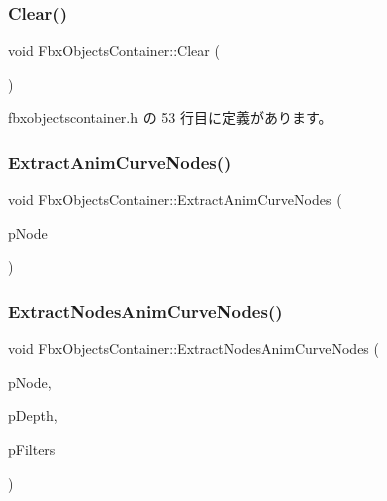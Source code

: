 \subsubsection{\texorpdfstring{Clear()}{Clear()}}
{\footnotesize\ttfamily void Fbx\+Objects\+Container\+::\+Clear (\begin{DoxyParamCaption}{ }\end{DoxyParamCaption})\hspace{0.3cm}{\ttfamily [inline]}}



 fbxobjectscontainer.\+h の 53 行目に定義があります。

\mbox{\label{class_fbx_objects_container_a649c2ed49d0c9f7b06cd241ab1a35686}} 
\subsubsection{\texorpdfstring{Extract\+Anim\+Curve\+Nodes()}{ExtractAnimCurveNodes()}}
{\footnotesize\ttfamily void Fbx\+Objects\+Container\+::\+Extract\+Anim\+Curve\+Nodes (\begin{DoxyParamCaption}\item[{\hyperlink{class_fbx_node}{Fbx\+Node} $\ast$}]{p\+Node }\end{DoxyParamCaption})\hspace{0.3cm}{\ttfamily [protected]}}

\mbox{\label{class_fbx_objects_container_aee1c40996023d5bc366599a64e609ccc}} 
\subsubsection{\texorpdfstring{Extract\+Nodes\+Anim\+Curve\+Nodes()}{ExtractNodesAnimCurveNodes()}}
{\footnotesize\ttfamily void Fbx\+Objects\+Container\+::\+Extract\+Nodes\+Anim\+Curve\+Nodes (\begin{DoxyParamCaption}\item[{\hyperlink{class_fbx_node}{Fbx\+Node} $\ast$}]{p\+Node,  }\item[{\hyperlink{class_fbx_objects_container_a70f47fef529be83cb1b45c0e067d73e5}{E\+Depth}}]{p\+Depth,  }\item[{const \hyperlink{fbxobjectscontainer_8h_a74af631b21bcb9d44e73d3293bf785df}{Fbx\+Attribute\+Filters} \&}]{p\+Filters }\end{DoxyParamCaption})\hspace{0.3cm}{\ttfamily [protected]}}

